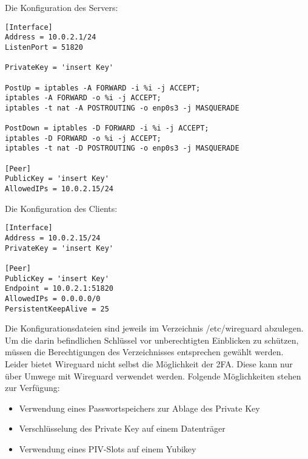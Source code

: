 \noindent Die Konfiguration des Servers:
\begin{verbatim}
[Interface]
Address = 10.0.2.1/24
ListenPort = 51820

PrivateKey = 'insert Key'

PostUp = iptables -A FORWARD -i %i -j ACCEPT; 
iptables -A FORWARD -o %i -j ACCEPT; 
iptables -t nat -A POSTROUTING -o enp0s3 -j MASQUERADE

PostDown = iptables -D FORWARD -i %i -j ACCEPT; 
iptables -D FORWARD -o %i -j ACCEPT; 
iptables -t nat -D POSTROUTING -o enp0s3 -j MASQUERADE

[Peer]  
PublicKey = 'insert Key'
AllowedIPs = 10.0.2.15/24
\end{verbatim}
\vspace{0.5cm}
\noindent Die Konfiguration des Clients:
\begin{verbatim}
[Interface]
Address = 10.0.2.15/24
PrivateKey = 'insert Key'

[Peer]  
PublicKey = 'insert Key'
Endpoint = 10.0.2.1:51820
AllowedIPs = 0.0.0.0/0
PersistentKeepAlive = 25
\end{verbatim}

\noindent Die Konfigurationsdateien sind jeweils im Verzeichnis /etc/wireguard abzulegen. Um die darin befindlichen Schl\"ussel vor unberechtigten Einblicken zu sch\"utzen, m\"ussen die Berechtigungen des Verzeichnisses entsprechen gew\"ahlt werden. \\

\noindent Leider bietet Wireguard nicht selbst die M\"oglichkeit der \ac{2FA}. Diese kann nur \"uber Umwege mit Wireguard verwendet werden. Folgende M\"oglichkeiten stehen zur Verf\"ugung:
   \begin{itemize}
      \item Verwendung eines Passwortspeichers zur Ablage des Private Key
      \item Verschl\"usselung des Private Key auf einem Datentr\"ager
			\item Verwendung eines PIV-Slots auf einem Yubikey
   \end{itemize}

